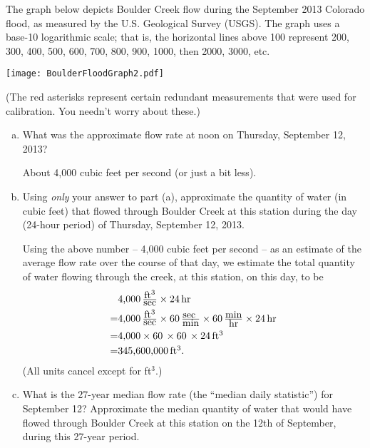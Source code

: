 \documentclass[12pt]{article}
\def\Red{\color{red}}
\def\Black{\color{black}}
\def\Red{\color{red}}
\def\Black{\color{black}}
\begin{document}
The graph below depicts Boulder Creek flow during the September 2013 Colorado flood, as measured by the U.S. Geological Survey (USGS). The graph uses a base-10 logarithmic scale; that is, the horizontal lines above 100 represent 200, 300, 400, 500, 600, 700, 800, 900, 1000, then 2000, 3000, etc.

\begin{center}
\texttt{[image: BoulderFloodGraph2.pdf]}
\end{center}

(The red asterisks represent certain redundant measurements that were used for calibration.  You needn't worry about these.)

\begin{enumerate}[(a)]

\item What was the approximate flow rate at noon on Thursday, September 12, 2013?

\Red About 4,000 cubic feet per second (or just a bit less).\Black
\vfill\eject

\item Using {\it only} your answer to part (a), approximate the quantity of water (in cubic feet) that flowed through Boulder Creek at this station during the day (24-hour period) of Thursday, September 12, 2013.

\Red
Using the above number -- 4,000 cubic feet per second -- as an estimate of the average flow rate over the course of that day, we estimate the total quantity of water flowing through the creek, at this station, on this day, to be
\begin{align*}& \hbox{4,000}\, {\textstyle \frac{\hbox{ft$^3$}}{\hbox{sec}}}\times  24\,  \hbox{hr} \\=& \hbox{4,000}\,  {\textstyle\frac{\hbox{ft$^3$}}{\hbox{sec}}}\times 60\,  {\textstyle\frac{\hbox{sec }}{\hbox{min}}}\times 60\,  {\textstyle\frac{\hbox{min}}{\hbox{hr}}}\times  24\,  \hbox{hr}\\=& \hbox{4,000}\times 60\,   \times 60\, \times  24 \, \hbox{ft$^3$} 
\\=& \hbox{345,600,000}\, \hbox{ft$^3$.} \end{align*}(All units cancel except for \hbox{ft$^3$}.)\Black
\vfill

\item  What is the 27-year median flow rate (the ``median daily statistic'') for September 12? Approximate the median quantity of water that would have flowed through Boulder Creek at this station on the 12th of September, during this 27-year period.


\end{enumerate}
\end{document}
